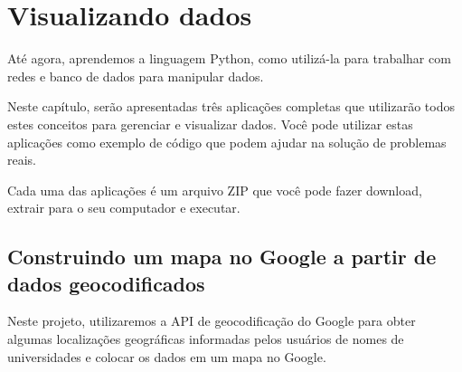 
\chapter{Visualizando dados}

Até agora, aprendemos a linguagem Python, como utilizá-la
para trabalhar com redes e banco de dados para manipular dados.

Neste capítulo, serão apresentadas três aplicações completas
que utilizarão todos estes conceitos para gerenciar e visualizar
dados. Você pode utilizar estas aplicações como exemplo de código
que podem ajudar na solução de problemas reais. 

Cada uma das aplicações é um arquivo ZIP que você pode fazer
download, extrair para o seu computador e executar.

\section{Construindo um mapa no Google a partir de dados geocodificados}

Neste projeto, utilizaremos a API de geocodificação do
Google para obter algumas localizações geográficas informadas
pelos usuários de nomes de universidades e colocar os dados
em um mapa no Google.

